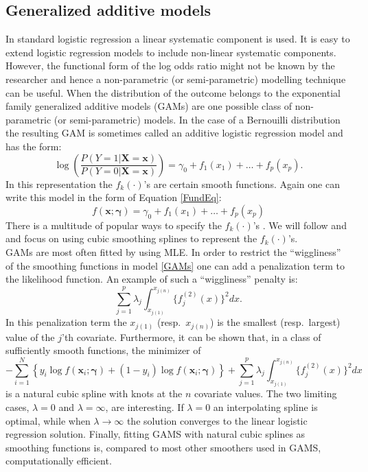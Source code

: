 \subsection{Generalized additive models}
\label{sec:GAM}
In standard logistic regression a linear systematic component is used. It is easy to extend logistic regression models to include non-linear systematic components. However, the functional form of the log odds ratio might not be known by the researcher and hence a non-parametric (or semi-parametric) modelling technique can be useful. When the distribution of the outcome belongs to the exponential family generalized additive models (GAMs) are one possible class of non-parametric (or semi-parametric) models. In the case of a Bernouilli distribution the resulting GAM is sometimes called an additive logistic regression model and has the form:
\begin{equation}
\label{GAMs}
\log \left( \frac{P(Y = 1|\bm{X} = \bm{x} )}{P(Y=0|\bm{X} = \bm{x})} \right) = \gamma_0 + f_1(x_{1}) + \dots + f_p(x_{p}).
\end{equation}
In this representation the $f_k(\cdot)$'s are certain smooth functions. Again one can write this model in the form of Equation \ref{FundEq}:
\[f(\bm{x};\bm{\gamma}) = \gamma_0 + f_1(x_{1}) + \dots + f_p(x_{p})\] 
There is a multitude of popular ways to specify the $f_k(\cdot)$'s \parencite{wood_generalized_2006, hastie_generalized_1990}. We will follow \cite{wood_generalized_2006} and \cite{wood_gams_2002} and focus on using cubic smoothing splines to represent the $f_k(\cdot)$'s. \\

GAMs are most often fitted by using MLE. In order to restrict the ``wiggliness'' of the smoothing functions in model \ref{GAMs} one can add a penalization term to the likelihood function. An example of such a ``wiggliness'' penalty is:
\[\sum_{j=1}^p \lambda_j \int_{x_{j(1)}}^{x_{j(n)}} \{f^{(2)}_j(x) \}^2dx.\]
In this penalization term the $x_{j(1)}$ (resp.\ $x_{j(n)}$) is the smallest (resp.\ largest) value of the $j$'th covariate. Furthermore, it can be shown that, in a class of sufficiently smooth functions, the minimizer of
\[- \sum_{i=1}^{N} \left\lbrace y_i \log{f(\bm{x}_i;\bm{\gamma})}  + (1-y_i)\log{f(\bm{x}_i;\bm{\gamma})} \right\rbrace + \sum_{j=1}^p \lambda_j \int_{x_{j(1)}}^{x_{j(n)}} \{f_j^{(2)}(x)\}^2 dx\]
is a natural cubic spline with knots at the $n$ covariate values. The two limiting cases, $\lambda = 0$ and $\lambda = \infty$, are interesting. If $\lambda = 0$ an interpolating spline is optimal, while when $\lambda \to \infty$ the solution converges to the linear logistic regression solution. Finally, fitting GAMS with natural cubic splines as smoothing functions is, compared to most other smoothers used in GAMS, computationally efficient.\\


